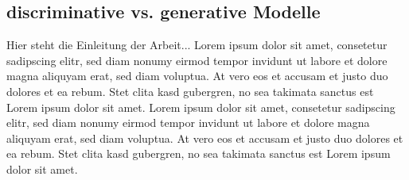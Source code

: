 \subsection{discriminative vs. generative Modelle}\label{discriminative vs. generative Modelle}
Hier steht die Einleitung der Arbeit... Lorem ipsum dolor sit amet, consetetur sadipscing elitr, sed diam nonumy eirmod tempor invidunt ut labore et dolore magna aliquyam erat, sed diam voluptua. At vero eos et accusam et justo duo dolores et ea rebum. Stet clita kasd gubergren, no sea takimata sanctus est Lorem ipsum dolor sit amet. Lorem ipsum dolor sit amet, consetetur sadipscing elitr, sed diam nonumy eirmod tempor invidunt ut labore et dolore magna aliquyam erat, sed diam voluptua. At vero eos et accusam et justo duo dolores et ea rebum. Stet clita kasd gubergren, no sea takimata sanctus est Lorem ipsum dolor sit amet.